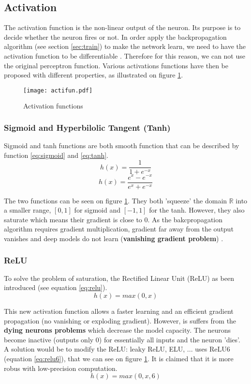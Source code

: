 \subsection{Activation} \label{subs:acti}
The activation function is the non-linear output of the neuron. Its purpose is to decide whether the neuron fires or not. In order apply the backpropagation algorithm (see section \ref{sec:train}) to make the network learn, we need to have the activation function to be differentiable \cite{lecun_backpropagation_1989}. Therefore for this reason, we can not use the original perceptron function. Various activations functions have then be proposed with different properties, as illustrated on figure \ref{fig:acti}.
%
\begin{figure}
    \centering
    \texttt{[image: actifun.pdf]}
    \caption{Activation functions}
    \label{fig:acti}
\end{figure}
%
\subsubsection{Sigmoid and Hyperbilolic Tangent (Tanh)}
Sigmoid and tanh functions are both smooth function that can be described by function \eqref{eq:sigmoid} and \eqref{eq:tanh}.
%
\begin{equation}
    h(x) = \frac{1}{1 + e^{-x}}
    \label{eq:sigmoid}
\end{equation}
%
\begin{equation}
    h(x) = \frac{e^{x} - e^{-x}}{e^{x} + e^{-x}}
    \label{eq:tanh}
\end{equation}

The two functions can be seen on figure \ref{fig:acti}. They both 'squeeze' the domain $\mathbb{R}$ into a smaller range, $[0, 1]$ for sigmoid and $[-1, 1]$ for the tanh. However, they also saturate which means their gradient is close to 0. As the bakcpropagation algorithm requires gradient multiplication, gradient far away from the output vanishes and deep models do not learn (\textbf{vanishing gradient problem}) \cite{goodfellow_deep_2016}.
%
\subsubsection{ReLU}
To solve the problem of saturation, the Rectified Linear Unit (ReLU) as been introduced \cite{krizhevsky_imagenet_2012} (see equation \eqref{eq:relu}).
\begin{equation}
    h(x) = max(0, x)
    \label{eq:relu}
\end{equation}

This new activation function allows a faster learning and an efficient gradient propagation (no vanishing or exploding gradient). However, is suffers from the \textbf{dying neurons problems} which decrease the model capacity. The neurons become inactive (outputs only 0) for essentially all inputs and the neuron 'dies'. A solution would be to modify the ReLU: leaky ReLU, ELU, ... \cite{howard_mobilenets_2017} uses ReLU6 (equation \ref{eq:relu6}), that we can see on figure \ref{fig:acti}. It is claimed that it is more robus with low-precision computation.
%
\begin{equation}
    h(x) = max(0, x, 6)
    \label{eq:relu6}
\end{equation}
